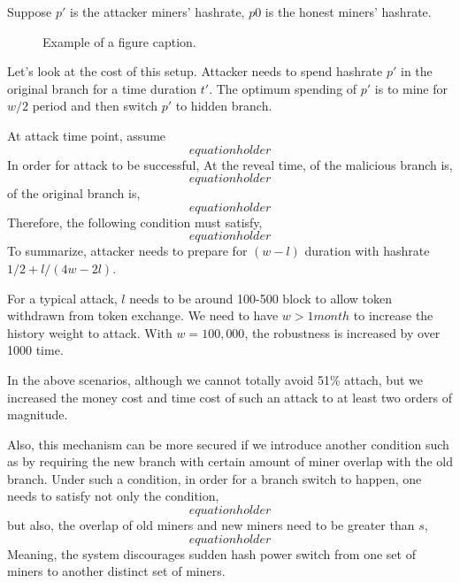\documentclass[conference]{IEEEtran}
\begin{document}
Suppose $p'$ is the attacker miners' hashrate, $p0$ is the honest miners' hashrate.

\begin{figure}[htbp]
\caption{Example of a figure caption.}
\label{fig}
\end{figure}

Let's look at the cost of this setup. Attacker needs to spend hashrate $p'$ in the original branch for a time duration $t'$. The optimum spending of $p'$ is to mine for $w/2$ period and then switch $p'$ to hidden branch. 

At attack time point, assume
\begin{equation}
equation holder\label{eq}
\end{equation}
In order for attack to be successful, At the reveal time,  of the malicious branch is,
\begin{equation}
equation holder\label{eq}
\end{equation}
 of the original branch is,
\begin{equation}
equation holder\label{eq}
\end{equation}
Therefore, the following condition must satisfy,
\begin{equation}
equation holder\label{eq}
\end{equation}
To summarize, attacker needs to prepare for $(w-l)$ duration with hashrate $1/2+l/(4w-2l)$.

For a typical attack, $l$ needs to be around 100-500 block to allow token withdrawn from token exchange. We need to have $w > 1 month$ to increase the history weight to attack. With $w = 100,000$, the robustness is increased by over 1000 time. 

In the above scenarios, although we cannot totally avoid 51\% attach, but we increased the money cost and time cost of such an attack to at least two orders of magnitude.

Also, this mechanism can be more secured if we introduce another condition such as by requiring the new branch with certain amount of miner overlap with the old branch. Under such a condition, in order for a branch switch to happen, one needs to satisfy not only the  condition,
\begin{equation}
equation holder\label{eq}
\end{equation} 
but also, the overlap of old miners and new miners need to be greater than $s$,
\begin{equation}
equation holder\label{eq}
\end{equation}
Meaning, the system discourages sudden hash power switch from one set of miners to another distinct set of miners.
\end{document}
